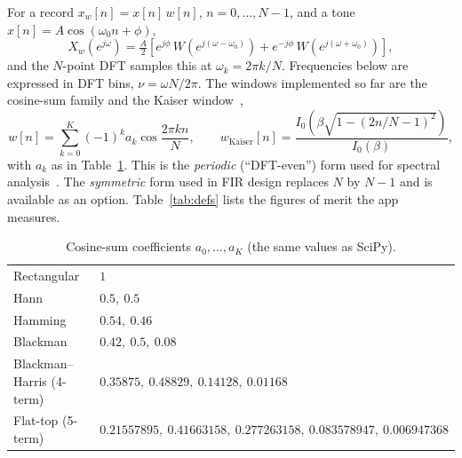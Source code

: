 \documentclass[11pt,a4paper]{article}
\begin{document}
For a record $x_w[n]=x[n]\,w[n]$, $n=0,\dots,N-1$, and a tone $x[n]=A\cos(\omega_0 n+\phi)$,
\begin{equation}
  X_w(e^{j\omega}) = \tfrac{A}{2}\left[e^{j\phi}\,W\!\left(e^{j(\omega-\omega_0)}\right)
                   + e^{-j\phi}\,W\!\left(e^{j(\omega+\omega_0)}\right)\right],
\end{equation}
and the $N$-point DFT samples this at $\omega_k = 2\pi k/N$. Frequencies below are expressed in
DFT bins, $\nu=\omega N/2\pi$. The windows implemented so far are the cosine-sum family and the
Kaiser window~\cite{kaiser},
\begin{equation}
  w[n]=\sum_{k=0}^{K}(-1)^k a_k\cos\frac{2\pi k n}{N},\qquad
  w_{\text{Kaiser}}[n]=\frac{I_0\!\left(\beta\sqrt{1-(2n/N-1)^2}\right)}{I_0(\beta)},
\end{equation}
with $a_k$ as in Table~\ref{tab:coeffs}. This is the \emph{periodic} (``DFT-even'') form used
for spectral analysis~\cite{harris}. The \emph{symmetric} form used in FIR design replaces $N$
by $N-1$ and is available as an option. Table~\ref{tab:defs} lists the figures of merit the
app measures.

\begin{table}[htbp]
  \centering\small
  \caption{Cosine-sum coefficients $a_0,\dots,a_K$ (the same values as SciPy).}
  \label{tab:coeffs}
  \begin{tabular}{ll}
    \hline
    Rectangular & $1$ \\
    Hann & $0.5,\ 0.5$ \\
    Hamming & $0.54,\ 0.46$ \\
    Blackman & $0.42,\ 0.5,\ 0.08$ \\
    Blackman--Harris (4-term) & $0.35875,\ 0.48829,\ 0.14128,\ 0.01168$ \\
    Flat-top (5-term) & $0.21557895,\ 0.41663158,\ 0.277263158,\ 0.083578947,\ 0.006947368$ \\
    \hline
  \end{tabular}
\end{table}
\end{document}
